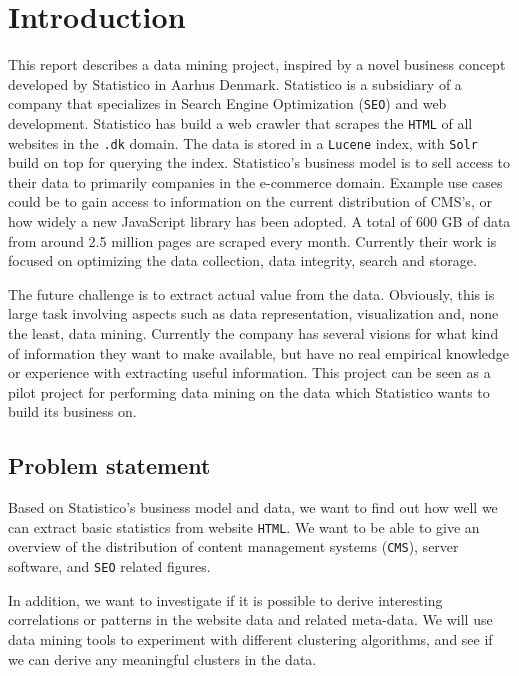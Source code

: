 \section{Introduction}
\label{sec:introduction}

This report describes a data mining project, inspired by a novel business concept developed by Statistico in Aarhus Denmark. Statistico is a subsidiary of a company that specializes in Search Engine Optimization (\texttt{SEO}) and web development. Statistico has build a web crawler that scrapes the \texttt{HTML} of all websites in the \texttt{.dk} domain. The data is stored in a \texttt{Lucene} \cite{lucene} index, with \texttt{Solr} \cite{solr} build on top for querying the index. Statistico's business model is to sell access to their data to primarily companies in the e-commerce domain. Example use cases could be to gain access to information on the current distribution of CMS's, or how widely a new JavaScript library has been adopted. A total of 600 GB of data from around 2.5 million pages are scraped every month. Currently their work is focused on optimizing the data collection, data integrity, search and storage.

The future challenge is to extract actual value from the data. Obviously, this is large task involving aspects such as data representation, visualization and, none the least, data mining. Currently the company has several visions for what kind of information they want to make available, but have no real empirical knowledge or experience with extracting useful information. This project can be seen as a pilot project for performing data mining on the data which Statistico wants to build its business on.


\subsection{Problem statement}
\label{subsec:problem_statement}

Based on Statistico's business model and data, we want to find out how well we can extract basic statistics from website \texttt{HTML}. We want to be able to give an overview of the distribution of content management systems (\texttt{CMS}), server software, and \texttt{SEO} related figures.

In addition, we want to investigate if it is possible to derive interesting correlations or patterns in the website data and related meta-data. We will use data mining tools to experiment with different clustering algorithms, and see if we can derive any meaningful clusters in the data.

